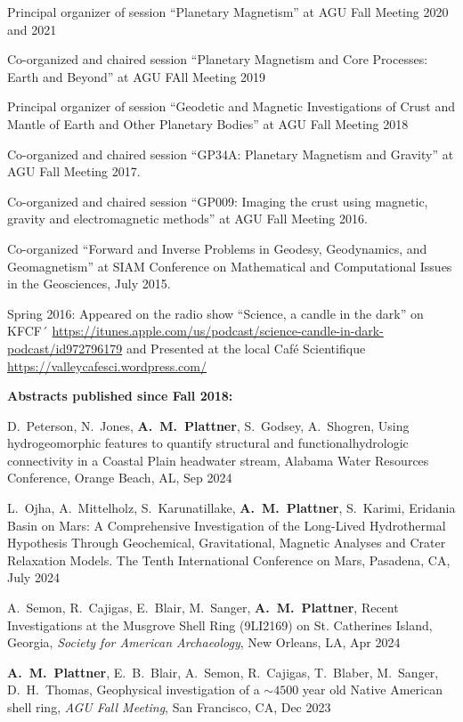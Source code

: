 \documentclass[10pt]{article}
\begin{document}
\spcp
Principal organizer of session ``Planetary Magnetism'' at AGU Fall Meeting 2020 and 2021

\spcp Co-organized and chaired session ``Planetary Magnetism
and Core Processes: Earth and Beyond'' at AGU FAll Meeting 2019

\spcp Principal organizer of session ``Geodetic and Magnetic
Investigations of Crust and Mantle of Earth and Other Planetary
Bodies'' at AGU Fall Meeting 2018

\spcp
Co-organized and chaired session
``GP34A: Planetary Magnetism and Gravity''
at AGU Fall Meeting 2017.
          
\spcp
Co-organized and chaired session
``GP009: Imaging the crust using magnetic, gravity and electromagnetic methods''
at AGU Fall Meeting 2016.

\spcp Co-organized ``Forward and Inverse Problems in Geodesy,
Geodynamics, and Geomagnetism'' at SIAM Conference on Mathematical and
Computational Issues in the Geosciences, July 2015.

\spcp
Spring 2016: Appeared on the radio show ``Science, a candle in the dark'' on KFCF´
\url{https://itunes.apple.com/us/podcast/science-candle-in-dark-podcast/id972796179} and Presented at the local Caf\'e Scientifique \url{https://valleycafesci.wordpress.com/}


\spc
\textbf{\tsize Abstracts published since Fall 2018:}

\spcp D.\ Peterson, N.\ Jones, \textbf{A.\ M.\ Plattner}, S.\ Godsey, A.\ Shogren, Using hydrogeomorphic features to quantify structural and functionalhydrologic connectivity in a Coastal Plain headwater stream, Alabama Water Resources Conference, Orange Beach, AL, Sep 2024

\spcp
L.\ Ojha, A.\ Mittelholz, S.\ Karunatillake, \textbf{A.\ M.\ Plattner}, S.\ Karimi, Eridania Basin on Mars: A Comprehensive Investigation of the Long-Lived Hydrothermal Hypothesis Through Geochemical, Gravitational, Magnetic Analyses and Crater Relaxation Models. The Tenth International Conference on Mars, Pasadena, CA, July 2024

\spcp A.\ Semon, R.\ Cajigas, E.\ Blair, M.\ Sanger, \textbf{A.\ M.\ Plattner}, Recent Investigations at the Musgrove Shell Ring (9LI2169) on St. Catherines Island, Georgia, \emph{Society for American Archaeology}, New Orleans, LA, Apr 2024

\spcp
\textbf{A.~M.~Plattner}, E.~B.~Blair, A.~Semon, R.~Cajigas, T.~Blaber, M.~Sanger, D.~H.~Thomas, Geophysical investigation of a $\sim4500$ year old Native American shell ring, \emph{AGU Fall Meeting}, San Francisco, CA, Dec 2023
\end{document}
